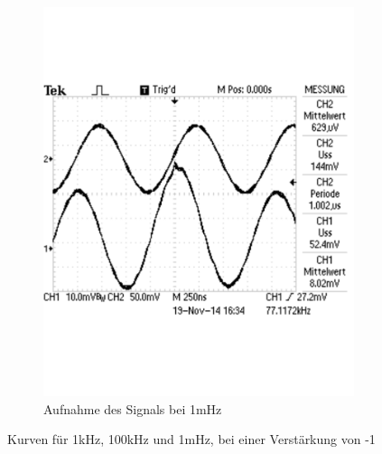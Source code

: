 \documentclass[12pt,a4paper]{article}
\begin{document}
\begin{figure}[H]
\begin{subfigure}[b]{0.28\textwidth}
                \includegraphics[width=\textwidth , scale = 0.4]{2_4_1_1m.pdf}
                \caption[Aufnahme des Signals bei 1mHz]{Aufnahme des Signals bei 1mHz}
  				\label{fig:2_4_1_1m}
        \end{subfigure}
        \caption{Kurven für 1kHz, 100kHz und 1mHz, bei einer Verstärkung von -1}
        \label{fig:2_4_1}
\end{figure}
\end{document}
